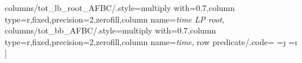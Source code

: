 \documentclass{informs3-noredtextontop}
\theoremstyle{TH}
\begin{document}
{\begin{table}[h]
                                                               columns/tot_lb_root_AFBC/.style={multiply with=0.7,column type=r,fixed,precision=2,zerofill,column name=\emph{time LP root}},
                                                               columns/tot_bb_AFBC/.style={multiply with=0.7,column type=r,fixed,precision=2,zerofill,column name=\emph{time}},
                                                               row predicate/.code={
                                                                                              \of{\allinstances}
                                                                                              \pgfmathsetmacro{\xn}{\pgfplotsretval}
                                                                                              \ifnum\xn=\j
                                                                                                              \of{\allinstances}
                                                                                                              \pgfmathsetmacro{\yn}{\pgfplotsretval}
                                                                                                              \ifnum\yn=\i
                                                                                                              \else
                                                                                                                              \pgfplotstableuserowfalse{}
                                                                                                              \fi
                                                                                              \else
                                                                                                              \pgfplotstableuserowfalse{}
                                                                                              \fi
                                                                               }
                                               ]\allinstances{}

                               \end{table}
                }
\end{document}
